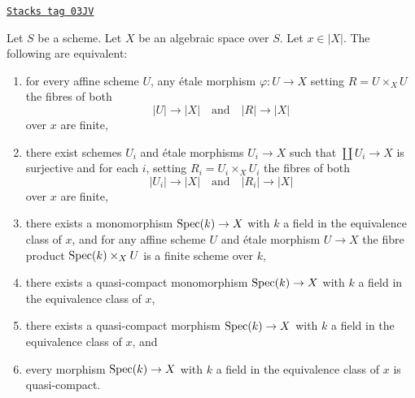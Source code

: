 \begin{lemma}
\label{decent-spaces-lemma-UR-finite-above-x}
\href{https://stacks.math.columbia.edu/tag/03JV}{\texttt{Stacks tag 03JV}}

Let $S$ be a scheme. Let $X$ be an algebraic space over $S$.
Let $x \in |X|$. The following are equivalent:
\begin{enumerate}
\item for every affine scheme $U$, any \'etale morphism
$\varphi : U \to X$ setting $R = U \times_X U$ the fibres of both
$$
|U| \longrightarrow |X|
\quad\text{and}\quad
|R| \longrightarrow |X|
$$
over $x$ are finite,
\item there exist schemes $U_i$ and \'etale morphisms
$U_i \to X$ such that $\coprod U_i \to X$ is surjective and for each
$i$, setting $R_i = U_i \times_X U_i$ the fibres of both
$$
|U_i| \longrightarrow |X|
\quad\text{and}\quad
|R_i| \longrightarrow |X|
$$
over $x$ are finite,
\item there exists a monomorphism $\operatorname{Spec}(k) \to X$ with $k$ a field
in the equivalence class of $x$, and for any affine scheme $U$ and \'etale
morphism $U \to X$ the fibre product $\operatorname{Spec}(k) \times_X U$ is
a finite scheme over $k$,
\item there exists a quasi-compact monomorphism $\operatorname{Spec}(k) \to X$
with $k$ a field in the equivalence class of $x$,
\item there exists a quasi-compact morphism $\operatorname{Spec}(k) \to X$
with $k$ a field in the equivalence class of $x$, and
\item every morphism $\operatorname{Spec}(k) \to X$ with $k$ a field in the
equivalence class of $x$ is quasi-compact.
\end{enumerate}
\end{lemma}

